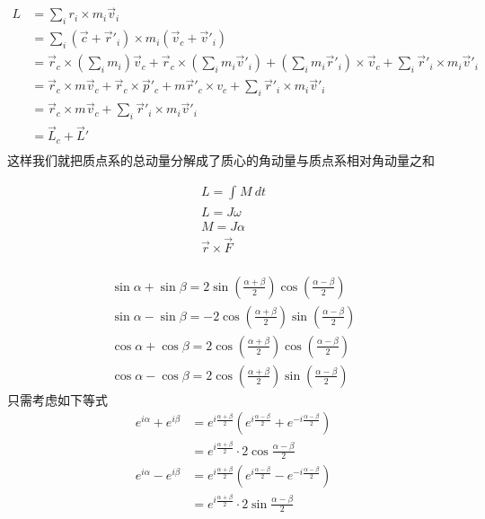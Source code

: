 \begin{thm}[质点系角动量的分解]
\begin{align*}
		L &= \sum_{i}^{} r_i \times m_i\vec v_i\\
		&= \sum_{i}^{}(\vec c+ \vec r'_i)\times m_i(\vec v_c+\vec v'_i) \\
		&= \vec r_c\times (\sum_i m_i)\vec v_c+ \vec r_c\times (\sum_im_i\vec v'_i)+(\sum_im_i\vec r'_i)\times \vec v_c+\sum_i\vec r'_i\times m_i\vec v'_i\\
		&= \vec r_c\times m\vec v_c+\vec r_c\times \vec p'_c+m\vec r'_c\times v_c+\sum_i\vec r'_i\times m_i\vec v'_i \\
		&= \vec r_c\times m\vec v_c + \sum_i\vec r'_i\times m_i\vec v'_i \\
		&= \vec L_c + \vec L' \\
\end{align*}
这样我们就把质点系的总动量分解成了质心的角动量与质点系相对角动量之和
\end{thm}
\begin{thm}
\begin{align*}
		L = \int_{{}}^{{}} {M} \: d{t} {}\\
		L = J\omega \\
		M = J \alpha \\
		\vec r\times \vec F\\
\end{align*}
\end{thm}
\begin{thm}
\begin{align*}
		\sin  \alpha+\sin \beta = 2\sin \left( \frac{\alpha+\beta}{2}  \right) \cos \left( \frac{\alpha-\beta}{2}  \right) \\
		\sin  \alpha-\sin \beta = -2\cos \left( \frac{\alpha+\beta}{2}  \right) \sin \left( \frac{\alpha-\beta}{2}  \right) \\
		\cos  \alpha+\cos \beta = 2\cos \left( \frac{\alpha+\beta}{2}  \right) \cos \left( \frac{\alpha-\beta}{2}  \right) \\
		\cos  \alpha-\cos \beta = 2\cos \left( \frac{\alpha+\beta}{2}  \right) \sin \left( \frac{\alpha-\beta}{2}  \right) 
\end{align*}
只需考虑如下等式
\begin{align*}
		e^{i\alpha}+e^{i\beta}&=e^{i\frac{ \alpha+\beta }{2} }\left( e^{i\frac{\alpha-\beta}{2}} + e^{-i \frac{\alpha-\beta}{2} }\right) 	\\
							  &= e^{i\frac{\alpha+\beta}{2}} \cdot 2\cos \frac{\alpha-\beta}{2} \\
		e^{i\alpha}-e^{i\beta}&=e^{i\frac{ \alpha+\beta }{2} }\left( e^{i\frac{\alpha-\beta}{2}} - e^{-i \frac{\alpha-\beta}{2} }\right) 	\\
							  &= e^{i\frac{\alpha+\beta}{2}} \cdot 2\sin \frac{\alpha-\beta}{2} 
\end{align*}
\end{thm}
